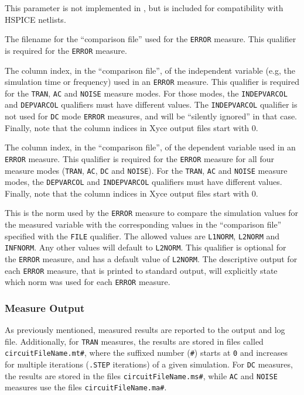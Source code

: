 \begin{Command}
\begin{Arguments}
This parameter is not implemented in \Xyce{}, but is included for compatibility
with HSPICE netlists.

The filename for the ``comparison file'' used for the {\tt ERROR}
measure.  This qualifier is required for the {\tt ERROR} measure.

The column index, in the ``comparison file'', of the independent
variable (e.g, the simulation time or frequency) used in an {\tt ERROR}
measure.  This qualifier is required for the {\tt TRAN}, {\tt AC} and {\tt NOISE}
measure modes.  For those modes, the {\tt INDEPVARCOL} and {\tt DEPVARCOL}
qualifiers must have different values.  The {\tt INDEPVARCOL}
qualifier is not used for {\tt DC} mode {\tt ERROR} measures, and will
be ``silently ignored'' in that case.  Finally, note that the column
indices in Xyce output files start with 0.

The column index, in the ``comparison file'', of the dependent
variable used in an {\tt ERROR} measure.  This qualifier is required
for the {\tt ERROR} measure for all four measure modes ({\tt TRAN},
{\tt AC}, {\tt DC} and {\tt NOISE}).  For the {\tt TRAN}, {\tt AC} and
{\tt NOISE} measure modes, the {\tt DEPVARCOL} and {\tt INDEPVARCOL}
qualifiers must have different values.  Finally, note
that the column indices in Xyce output files start with 0.

This is the norm used by the {\tt ERROR} measure to compare the
simulation values for the measured variable with the corresponding
values in the ``comparison file'' specified with the {\tt FILE}
qualifier.  The allowed values are {\tt L1NORM}, {\tt L2NORM} and {\tt
INFNORM}.  Any other values will default to {\tt L2NORM}.  This
qualifier is optional for the {\tt ERROR} measure, and has a default
value of {\tt L2NORM}.  The descriptive output for each {\tt ERROR}
measure, that is printed to standard output, will explicitly state
which norm was used for each {\tt ERROR} measure.

\end{Arguments}

\end {Command}

\subsubsection{Measure Output}
\label{Measure_Measurement_Output}
As previously mentioned, measured results are reported to the output
and log file.  Additionally, for \texttt{TRAN} measures, the results
are stored in files called
\texttt{circuitFileName.mt\#}, where the suffixed number (\texttt{\#}) starts
at \texttt{0} and increases for multiple iterations (\texttt{.STEP}
iterations) of a given simulation. For \texttt{DC} measures, the results are
stored in the files \texttt{circuitFileName.ms\#}, while \texttt{AC} and
\texttt{NOISE} measures use the files \texttt{circuitFileName.ma\#}.

